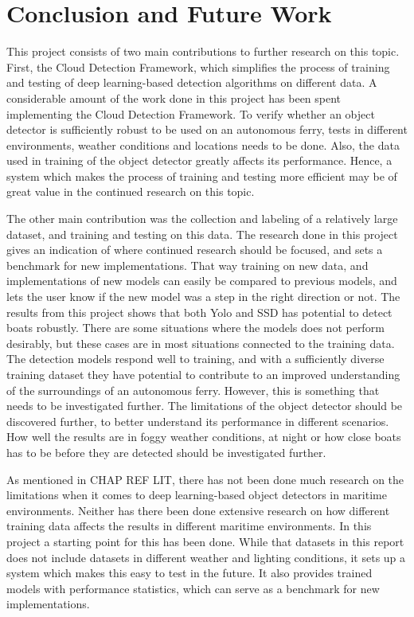 \chapter{Conclusion and Future Work}

This project consists of two main contributions to further research on this topic. First, the Cloud Detection Framework, which simplifies the process of training and testing of deep learning-based detection algorithms on different data. A considerable amount of the work done in this project has been spent implementing the Cloud Detection Framework. To verify whether an object detector is sufficiently robust to be used on an autonomous ferry, tests in different environments, weather conditions and locations needs to be done. Also, the data used in training of the object detector greatly affects its performance. Hence, a system which makes the process of training and testing more efficient may be of great value in the continued research on this topic.

\vspace{3mm}

The other main contribution was the collection and labeling of a relatively large dataset, and training and testing on this data. The research done in this project gives an indication of where continued research should be focused, and sets a benchmark for new implementations. That way training on new data, and implementations of new models can easily be compared to previous models, and lets the user know if the new model was a step in the right direction or not. The results from this project shows that both Yolo and SSD has potential to detect boats robustly. There are some situations where the models does not perform desirably, but these cases are in most situations connected to the training data. The detection models respond well to training, and with a sufficiently diverse training dataset they have potential to contribute to an improved understanding of the surroundings of an autonomous ferry. However, this is something that needs to be investigated further. The limitations of the object detector should be discovered further, to better understand its performance in different scenarios. How well the results are in foggy weather conditions, at night or how close boats has to be before they are detected should be investigated further. 

\vspace{3mm}

As mentioned in CHAP REF LIT, there has not been done much research on the limitations when it comes to deep learning-based object detectors in maritime environments. Neither has there been done extensive research on how different training data affects the results in different maritime environments. In this project a starting point for this has been done. While that datasets in this report does not include datasets in different weather and lighting conditions, it sets up a system which makes this easy to test in the future. It also provides trained models with performance statistics, which can serve as a benchmark for new implementations.

